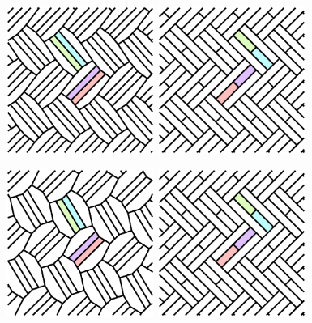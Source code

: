 \documentclass{beamer}
\begin{document}
\begin{frame}
  \begin{center}
    \includegraphics[width=1.9in]{c02}
    \includegraphics[width=1.9in]{c12}
  \end{center}
\end{frame}

\begin{frame}
  \begin{center}
    \includegraphics[width=1.9in]{c03}
    \includegraphics[width=1.9in]{c12}
  \end{center}
\end{frame}
\end{document}
